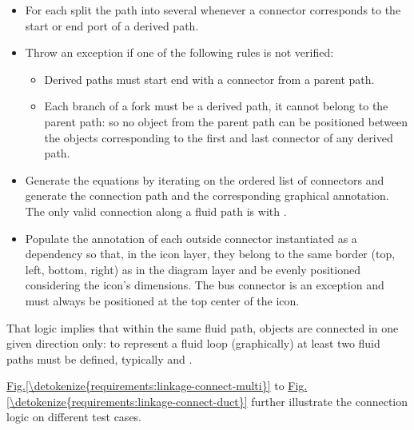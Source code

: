 \documentclass[letterpaper,10pt, openany,english]{sphinxmanual}
\begin{document}
\begin{itemize}
\begin{itemize}
\begin{itemize}
\end{itemize}

\item {} 
For each  split the path into several  whenever a connector corresponds to the start or end port of a derived path.

\item {} 
Throw an exception if one of the following rules is not verified:
\begin{itemize}
\item {} 
Derived paths must start  end with a connector from a parent path.

\item {} 
Each branch of a fork must be a derived path, it cannot belong to the parent path: so no object from the parent path can be positioned between the objects corresponding to the first and last connector of any derived path.

\end{itemize}

\item {} 
Generate the  equations by iterating on the ordered list of connectors and generate the connection path and the corresponding graphical annotation. The only valid connection along a fluid path is  with .

\item {} 
Populate the  annotation of each outside connector instantiated as a dependency so that, in the icon layer, they belong to the same border (top, left, bottom, right) as in the diagram layer and be evenly positioned considering the icon’s dimensions. The bus connector is an exception and must always be positioned at the top center of the icon.

\end{itemize}

\end{itemize}

That logic implies that within the same fluid path, objects are connected in one given direction only: to represent a fluid loop (graphically) at least two fluid paths must be defined, typically  and .

\hyperref[\detokenize{requirements:linkage-connect-multi}]{Fig.\@ \ref{\detokenize{requirements:linkage-connect-multi}}} to \hyperref[\detokenize{requirements:linkage-connect-duct}]{Fig.\@ \ref{\detokenize{requirements:linkage-connect-duct}}} further illustrate the connection logic on different test cases.
\end{document}

